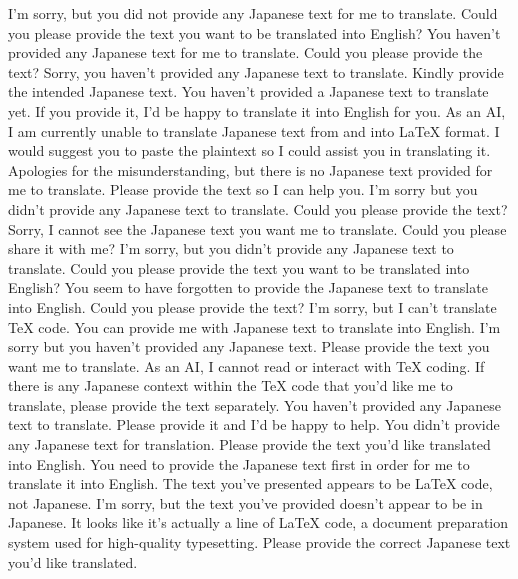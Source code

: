 {%
I'm sorry, but you did not provide any Japanese text for me to translate. Could you please provide the text you want to be translated into English?
You haven't provided any Japanese text for me to translate. Could you please provide the text?
Sorry, you haven't provided any Japanese text to translate. Kindly provide the intended Japanese text.
You haven't provided a Japanese text to translate yet. If you provide it, I'd be happy to translate it into English for you.
As an AI, I am currently unable to translate Japanese text from and into LaTeX format. I would suggest you to paste the plaintext so I could assist you in translating it.
Apologies for the misunderstanding, but there is no Japanese text provided for me to translate. Please provide the text so I can help you.
I'm sorry but you didn't provide any Japanese text to translate. Could you please provide the text?
Sorry, I cannot see the Japanese text you want me to translate. Could you please share it with me?
I'm sorry, but you didn't provide any Japanese text to translate. Could you please provide the text you want to be translated into English?
You seem to have forgotten to provide the Japanese text to translate into English. Could you please provide the text?
I'm sorry, but I can't translate TeX code. You can provide me with Japanese text to translate into English.
I'm sorry but you haven't provided any Japanese text. Please provide the text you want me to translate.
As an AI, I cannot read or interact with TeX coding. If there is any Japanese context within the TeX code that you'd like me to translate, please provide the text separately.
You haven't provided any Japanese text to translate. Please provide it and I'd be happy to help.
You didn't provide any Japanese text for translation. Please provide the text you'd like translated into English.
You need to provide the Japanese text first in order for me to translate it into English. The text you've presented appears to be LaTeX code, not Japanese.
I'm sorry, but the text you've provided doesn't appear to be in Japanese. It looks like it's actually a line of LaTeX code, a document preparation system used for high-quality typesetting. Please provide the correct Japanese text you'd like translated.
}
